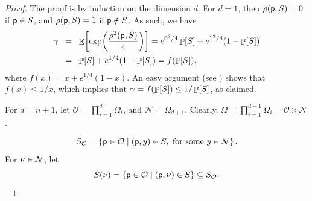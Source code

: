 \begin{proof}
    The proof is by induction on the dimension $d$. For $d=1$, then
    $\distTY{\pnt}{\SetA} = 0$ if $\mathsf{p} \in S$, and
    $\distTY{\pnt}{\SetA}= 1$ if $\mathsf{p} \notin S$. As such, we have
    \begin{align*}
        \gamma
        &\EQ
        \Ex{ \exp \pth{\frac{\distTSqY{\pnt}{\SetA} }{4}}}%
        =%
        e^{0^2/4} \Prob{\SetA} + e^{1^2/4} (1-\Prob{\SetA})
        \\&
        \EQ%
        \Prob{\SetA} + e^{1/4}(1-\Prob{\SetA})= f\pth{\Prob{\SetA}},
    \end{align*}                   
    where $f(x) = x + e^{1/4}(1-x)$. An easy argument (see
    ) shows that $f(x) \leq 1/x$, which implies
    that $\gamma = f(\Prob{\SetA}) \leq 1/ \Prob{\SetA}$, as claimed.
    
    For $d=n+1$, let $\mathcal{O} = \prod_{i=1}^d \Omega_i$, and
    $\mathcal{N} = \Omega_{d+1}$. Clearly,
    $\Omega =\prod_{i=1}^{d+1} \Omega_i = \mathcal{O} \times
    \mathcal{N}$.

    \begin{equation*}
        S_{\mathcal{O}}  =
        \left\{  \mathsf{p} \in \mathcal{O}  \;\middle\vert\;  (\mathsf{p},y) \in S, \text{ for
              some } y \in \mathcal{N} \right\}.
    \end{equation*}
    For $\nu \in {\mathcal{N}}$, let 
    \begin{equation*}
        \SetA(\nu)%
        =%
        \Set{ \pnt \in \mathcal{O} }{ (\pnt,\nu) \in \SetA } \subseteq
        \SetA_\OldOm .
    \end{equation*}


\end{proof}
